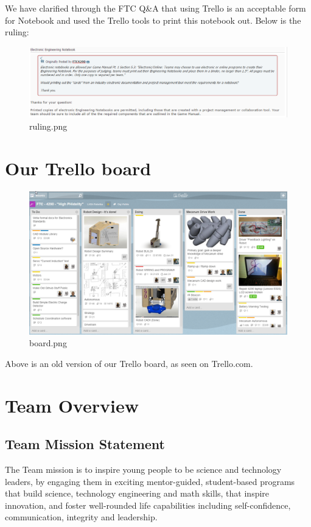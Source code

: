We have clarified through the FTC Q\&A that using Trello is an acceptable form for Notebook and used the Trello tools to print this notebook out. Below is the ruling:\\

\begin{figure}[H]
	\centering
	\includegraphics[width=\linewidth]{ruling}
	\caption[]{ruling.png}
	\label{fig:ruling}
\end{figure}

\clearpage
\newpage

\section{Our Trello board}
\begin{figure}[H]
	\centering
	\includegraphics[width=\linewidth]{board}
	\caption[]{board.png}
	\label{fig:board}
\end{figure}
Above is an old version of our Trello board, as seen on Trello.com.
\clearpage
\newpage

\section{Team Overview}
\subsection{Team Mission Statement}
The Team mission is to inspire young people to be science and technology leaders, by engaging them in exciting mentor-guided, student-based programs that build science, technology engineering and math skills, that inspire innovation, and foster well-rounded life capabilities including self-confidence, communication, integrity and leadership.

